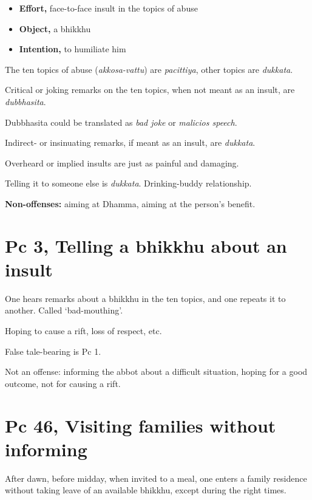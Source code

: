 \begin{multicols}{2}

\begin{itemize}
\tightlist
\item
  \textbf{Effort,} face-to-face insult in the topics of abuse
\item
  \textbf{Object,} a bhikkhu
\item
  \textbf{Intention,} to humiliate him
\end{itemize}

The ten topics of abuse (\emph{akkosa-vattu}) are \emph{pacittiya},
other topics are \emph{dukkata}.

Critical or joking remarks on the ten topics, when not meant as an
insult, are \emph{dubbhasita}.

Dubbhasita could be translated as \emph{bad joke} or \emph{malicios
speech}.

Indirect- or insinuating remarks, if meant as an insult, are
\emph{dukkata}.

Overheard or implied insults are just as painful and damaging.

Telling it to someone else is \emph{dukkata}. Drinking-buddy
relationship.


\textbf{Non-offenses:} aiming at Dhamma, aiming at the person's benefit.

\end{multicols}

\section{Pc 3, Telling a bhikkhu about an insult}

One hears remarks about a bhikkhu in the ten topics, and one repeats it
to another. Called `bad-mouthing'.

Hoping to cause a rift, loss of respect, etc.

False tale-bearing is Pc 1.

Not an offense: informing the abbot about a difficult situation, hoping
for a good outcome, not for causing a rift.

\section{Pc 46, Visiting families without informing}

After dawn, before midday, when invited to a meal, one enters a family
residence without taking leave of an available bhikkhu, except during
the right times.

